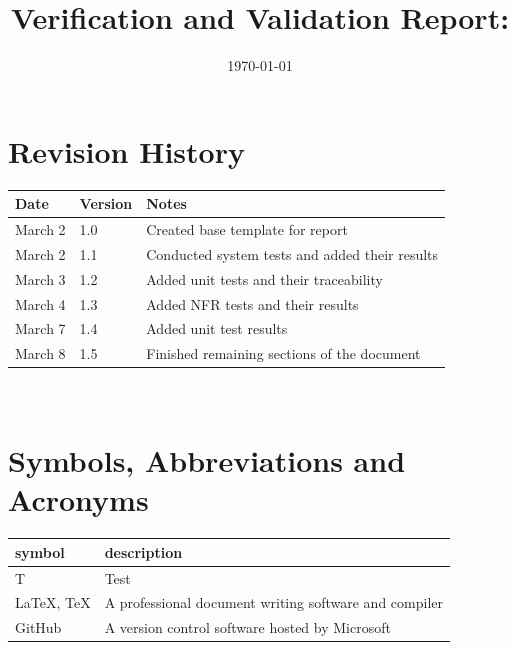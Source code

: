 \documentclass[12pt, titlepage]{article}
\begin{document}
\title{Verification and Validation Report: \progname} 
\author{\authname}
\date{\today}
	
 \maketitle


\section{Revision History}

\begin{tabularx}{\textwidth}{p{3cm}p{2cm}X}
\toprule {\bf Date} & {\bf Version} & {\bf Notes}\\
\midrule
March 2 & 1.0 & Created base template for report\\
March 2 & 1.1 & Conducted system tests and added their results\\
March 3 & 1.2 & Added unit tests and their traceability\\
March 4 & 1.3 & Added NFR tests and their results \\
March 7 & 1.4 & Added unit test results \\
March 8 & 1.5 & Finished remaining sections of the document \\
\bottomrule
\end{tabularx}

~\newpage

\section{Symbols, Abbreviations and Acronyms}

\renewcommand{\arraystretch}{1.2}
\begin{tabular}{l l} 
  \toprule		
  \textbf{symbol} & \textbf{description}\\
  \midrule 
  T & Test\\
  LaTeX, TeX & A professional document writing software and compiler\\
  GitHub & A version control software hosted by Microsoft\\
  \bottomrule
\end{tabular}\\


\newpage

\tableofcontents
\end{document}
